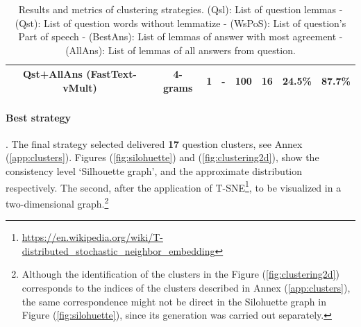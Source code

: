 \begin{table}[!th]
{\begin{tabular}{c | c | c| c | c | c | c | c}
		Qst+AllAns (FastText-vMult) & 4-grams             & 1           & -             & 100         & 16          & 24.5\%           & 87.7\%     \\      
		\bottomrule
	\end{tabular}}
	\caption{Results and metrics of clustering strategies. (Qsl): List of question lemmas - 
		(Qst): List of question words without lemmatize -
		(WsPoS): List of question's Part of speech -
		(BestAns): List of lemmas of answer with most agreement -
	(AllAns): List of lemmas of all answers from question.}
	\label{table:strategies_results}
\end{table}

\paragraph{\textbf{Best strategy}}. 
The final strategy selected delivered \textbf{17} question clusters, see Annex (\ref{app:clusters}). Figures (\ref{fig:silohuette}) and (\ref{fig:clustering2d}), show the consistency level `Silhouette graph', and the approximate distribution respectively. The second, after the application of T-SNE\footnote{\url{https://en.wikipedia.org/wiki/T-distributed_stochastic_neighbor_embedding}}, to be visualized in a two-dimensional graph.\footnote{Although the identification of the clusters in the Figure (\ref{fig:clustering2d}) corresponds to the indices of the clusters described in Annex (\ref{app:clusters}), the same correspondence might not be direct in the Silohuette graph in Figure (\ref{fig:silohuette}), since its generation was carried out separately.}


